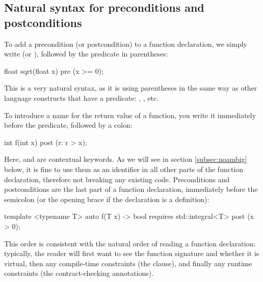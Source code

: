 \subsection{Natural syntax for preconditions and postconditions}

To add a precondition (or postcondition) to a function declaration, we simply write  (or ), followed by the predicate in parentheses:

\vspace{2mm}
\begin{codeblock}
float sqrt(float x)
  pre (x >= 0);
\end{codeblock}
\vspace{2mm}

This is a very natural syntax, as it is using parentheses in the same way as other language constructs that have a predicate: , , etc.

To introduce a name for the return value of a function, you write it immediately before the predicate, followed by a colon:

\vspace{2mm}
\begin{codeblock}
int f(int x)
  post (r: r > x);
\end{codeblock}
\vspace{2mm}

Here,  and  are contextual keywords. As we will see in section \ref{subsec:noambig} below, it is fine to use them as an identifier in all other parts of the function declaration, therefore not breaking any existing code. Preconditions and postconditions are the last part of a function declaration, immediately before the semicolon (or the opening brace if the declaration is a definition):

\vspace{2mm}
\begin{codeblock}
template <typename T>
auto f(T x) -> bool
  requires std::integral<T>
  post (x > 0);
\end{codeblock}
\vspace{2mm}

This order is consistent with the natural order of reading a function declaration: typically, the reader will first want to see the function signature and whether it is virtual, then any compile-time constraints (the  clause), and finally any runtime constraints (the contract-checking annotations).

